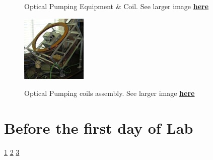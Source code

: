 \documentclass{../lab}
\begin{document}
\begin{figure}[h]
\begin{minipage}{0.36\textwidth}
    \caption{Optical Pumping Equipment \& Coil. See larger image \href{http://experimentationlab.berkeley.edu/sites/default/files/images/OPT_3548.jpg}{\textbf{here}}}
\end{minipage}
\begin{minipage}{0.25\textwidth}
    \href{http://experimentationlab.berkeley.edu/sites/default/files/images/OPT_Coils_Top_t9743.jpg}{\includegraphics[width=\linewidth,keepaspectratio]{images/OPT_Top_t9743.jpg}}
    \caption{Optical Pumping coils assembly. See larger image \href{http://experimentationlab.berkeley.edu/sites/default/files/images/OPT_Coils_Top_t9743.jpg}{\textbf{here}}}
\end{minipage}
\end{figure}

\section{Before the first day of Lab}

\signatures \hyperlink{DS345 Preparation}{ 1} \hyperlink{Resonance Conditions and Symmetry}{  2} \hyperlink{Error Analysis Methods}{  3}
\end{document}
